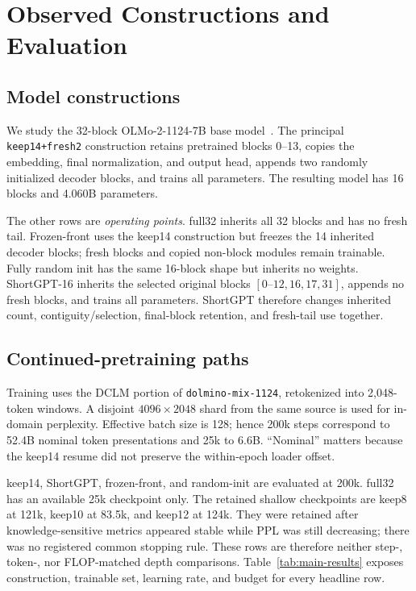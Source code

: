 \section{Observed Constructions and Evaluation}
\label{sec:method}

\subsection{Model constructions}
We study the 32-block OLMo-2-1124-7B base model~\citep{olmo2}. The principal
\texttt{keep14+fresh2} construction retains pretrained blocks 0--13, copies the
embedding, final normalization, and output head, appends two randomly
initialized decoder blocks, and trains all parameters. The resulting model has
16 blocks and 4.060B parameters.

The other rows are \emph{operating points}. full32 inherits all 32 blocks and
has no fresh tail. Frozen-front uses the keep14 construction but freezes the 14
inherited decoder blocks; fresh blocks and copied non-block modules remain
trainable. Fully random init has the same 16-block shape but inherits no
weights. ShortGPT-16 inherits the selected original blocks
$[0\text{--}12,16,17,31]$, appends no fresh blocks, and trains all parameters.
ShortGPT therefore changes inherited count, contiguity/selection, final-block
retention, and fresh-tail use together.

\subsection{Continued-pretraining paths}
Training uses the DCLM portion of \texttt{dolmino-mix-1124}, retokenized into
2,048-token windows. A disjoint $4096\times2048$ shard from the same source is
used for in-domain perplexity. Effective batch size is 128; hence 200k steps
correspond to 52.4B nominal token presentations and 25k to 6.6B. ``Nominal''
matters because the keep14 resume did not preserve the within-epoch loader
offset.

keep14, ShortGPT, frozen-front, and random-init are evaluated at 200k. full32
has an available 25k checkpoint only. The retained shallow checkpoints are
keep8 at 121k, keep10 at 83.5k, and keep12 at 124k. They were retained after
knowledge-sensitive metrics appeared stable while PPL was still decreasing;
there was no registered common stopping rule. These rows are therefore neither
step-, token-, nor FLOP-matched depth comparisons. Table~\ref{tab:main-results}
exposes construction, trainable set, learning rate, and budget for every
headline row.


